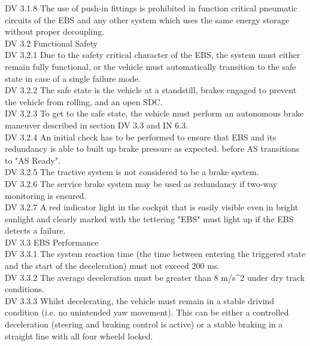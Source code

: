 \documentclass{article}
\begin{document}
DV 3.1.8 The use of push-in fittings is prohibited in function critical pneumatic circuits of the EBS and any other system which uses the same energy storage without proper decoupling.\\

DV 3.2 Functional Safety\\

DV 3.2.1 Due to the safety critical character of the EBS, the system must either remain fully functional, or the vehicle must automatically transition to the safe state in case of a single failure mode.\\

DV 3.2.2 The safe state is the vehicle at a standstill, brakes engaged to prevent the vehicle from rolling, and an open SDC.\\

DV 3.2.3 To get to the safe state, the vehicle must perform an autonomous brake maneuver described in section DV 3.3 and IN 6.3.\\

DV 3.2.4 An initial check has to be performed to ensure that EBS and its redundancy is able to built up brake pressure as expected. before AS transitions to "AS Ready".\\

DV 3.2.5 The tractive system is not considered to be a brake system.\\

DV 3.2.6 The service brake system may be used as redundancy if two-way monitoring is ensured.\\

DV 3.2.7 A red indicator light in the cockpit that is easily visible even in bright sunlight and clearly marked with the tettering "EBS" must light up if the EBS detects a failure.\\

DV 3.3 EBS Performance\\

DV 3.3.1 The system reaction time (the time between entering the triggered state and the start of the deceleration) must not exceed 200 ms.\\

DV 3.3.2 The average deceleration must be greater than 8 m/s^2 under dry track conditions.\\

DV 3.3.3 Whilst decelerating, the vehicle must remain in a stable drivind condition (i.e. no unintended yaw movement). This can be either a controlled deceleration (steering and braking control is active) or a stable braking in a straight line with all four wheeld locked.\\
\end{document}
